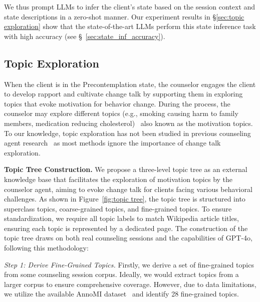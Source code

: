We thus prompt LLMs to infer the client's state based on the session context and state descriptions in a zero-shot manner. Our experiment results in §\ref{sec:topic exploration} show that the state-of-the-art LLMs perform this state inference task with high accuracy (see §~\ref{sec:state_inf_accuracy}).
\subsection{Topic Exploration}
\label{sec: topic exploration}

When the client is in the Precontemplation state, the counselor engages the client to develop rapport and cultivate change talk by supporting them in exploring topics that evoke motivation for behavior change. During the process, the counselor may explore different topics (e.g., smoking causing harm to family members, medication reducing cholesterol)~\citep{cole2023using} also known as the motivation topics. 
To our knowledge, topic exploration has not been studied in previous counseling agent research~\citep{hsu2023helping,xie2024few,sun2024chain} as most methods ignore the importance of change talk exploration. 

\noindent
\textbf{Topic Tree Construction.} We propose a three-level topic tree as an external knowledge base that facilitates the exploration of motivation topics by the counselor agent, aiming to evoke change talk for clients facing various behavioral challenges. As shown in Figure~\ref{fig:topic tree}, the topic tree is structured into superclass topics, coarse-grained topics, and fine-grained topics. To ensure standardization, we require all topic labels to match Wikipedia article titles, ensuring each topic is represented by a dedicated page. The construction of the topic tree draws on both real counseling sessions and the capabilities of GPT-4o, following this methodology:

    \noindent
    \textit{Step 1: Derive Fine-Grained Topics.} Firstly, we derive a set of fine-grained topics from some counseling session corpus. Ideally, we would extract topics from a larger corpus to ensure comprehensive coverage. However, due to data limitations, we utilize the available AnnoMI dataset~\citep{wu2022anno,wu2023creation} and identify 28 fine-grained topics. 
    

